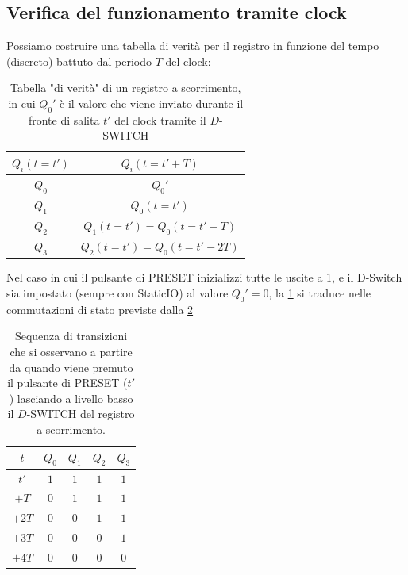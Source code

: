 \documentclass[10pt, a4paper, italian]{article}
\begin{document}
\subsection{Verifica del funzionamento tramite clock}\label{sbs: clock_reg}
Possiamo costruire una tabella di verità per il registro in funzione del tempo
(discreto) battuto dal periodo $T$ del clock:
\begin{table}[htbp]
\centering
\begin{tabular}{c|c}
\toprule
$Q_i(t = t')$ & $Q_i(t = t' + T)$\\
\midrule
\midrule
$Q_0$ & $Q_0'$ \\
$Q_1$ & $Q_0(t=t')$ \\
$Q_2$ & $Q_1(t=t') = Q_0(t = t' - T)$ \\
$Q_3$ & $Q_2(t=t') = Q_0(t = t'- 2T)$ \\
\bottomrule
\end{tabular}
\caption{Tabella "di verità" di un registro a scorrimento, in cui $Q_0'$ è il
valore che viene inviato durante il fronte di salita $t'$ del clock tramite
il $D$-SWITCH
\label{tab: S-register}}
\end{table}

Nel caso in cui il pulsante di PRESET inizializzi tutte le uscite a 1, e il
D-Switch sia impostato (sempre con StaticIO) al valore $Q_0' = 0$, la
\cref{tab: S-register} si traduce nelle commutazioni di stato previste dalla
\cref{tab: s-reg-truth}
\begin{table}[htbp]
	\centering
	\begin{tabular}{c|cccc}
	\toprule
	$t$	  &		$Q_0$	&	$Q_1$	& $Q_2$	&	$Q_3$  \\
	\midrule
	\midrule
		$t'$ 	&	$1$	&	$1$	&	$1$	&	$1$	\\
		$+T$	&	$0$	&	$1$	&	$1$	&	$1$	\\
		$+2T$	&	$0$	&	$0$	&	$1$	&	$1$	\\
		$+3T$	&	$0$	&	$0$	&	$0$	&	$1$	\\
		$+4T$	&	$0$	&	$0$	&	$0$	&	$0$	\\		
	\bottomrule
	\end{tabular}
\caption{Sequenza di transizioni che si osservano a partire da quando viene
premuto il pulsante di PRESET ($t'$) lasciando a livello basso il $D$-SWITCH
del registro a scorrimento. \label{tab: s-reg-truth}}
\end{table}
\end{document}
